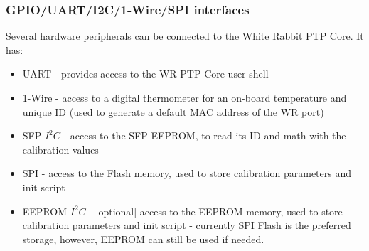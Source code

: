 \subsubsection{GPIO/UART/I2C/1-Wire/SPI interfaces}
\label{sec:wrpc_periph}

Several hardware peripherals can be connected to the White Rabbit PTP Core. It
has:
\begin{itemize}
  \item UART - provides access to the WR PTP Core user shell
  \item 1-Wire - access to a digital thermometer for an on-board temperature and
    unique ID (used to generate a default MAC address of the WR port)
  \item SFP $I^2C$ - access to the SFP EEPROM, to read its ID and math with the
    calibration values
  \item SPI - access to the Flash memory, used to store calibration
    parameters and init script
  \item EEPROM $I^2C$ - [optional] access to the EEPROM memory, used to store
    calibration parameters and init script - currently SPI Flash is the
    preferred storage, however, EEPROM can still be used if needed.
\end{itemize}
